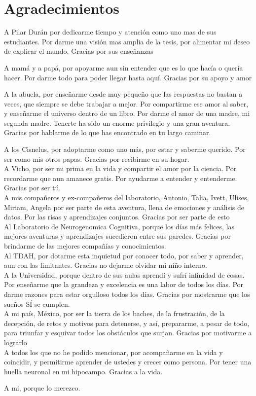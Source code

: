 \documentclass[12pt,letterpaper,final]{article}
\renewenvironment{acknowledgements}
{\newpage\section*{Agradecimientos}\begin{singlespace}\normalsize}
	{\end{singlespace}\par\newpage}
\begin{document}
\begin{acknowledgements}
A Pilar Durán por dedicarme tiempo y atención como uno mas de sus estudiantes. Por darme una visión mas amplia de la tesis, por alimentar mi deseo de explicar el mundo. Gracias por sus enseñanzas

A mamá y a papá, por apoyarme aun sin entender que es lo que hacía o quería hacer. Por darme todo para poder llegar hasta aquí. Gracias por su apoyo y amor

A la abuela, por enseñarme desde muy pequeño que las respuestas no bastan a veces, que siempre se debe trabajar a mejor. Por compartirme ese amor al saber, y enseñarme el universo dentro de un libro. Por darme el amor de una madre, mi segunda madre. Tenerte ha sido un enorme privilegio y una gran aventura.  Gracias por hablarme de lo que has encontrado en tu largo caminar.

A los Cisnelus, por adoptarme como uno más, por estar y saberme querido. Por ser como mis otros papas. Gracias por recibirme en su hogar.\\

A Vicho, por ser mi prima en la vida y compartir el amor por la ciencia. Por recordarme que aun amanece gratis.
Por ayudarme a entender y entenderme. Gracias por ser tú. \\

A mis compañeros y ex-compañeros del laboratorio, Antonio, Talia, Ivett, Ulises, Miriam, Angela por ser parte de esta aventura, llena de emociones y análisis de datos. Por las risas y aprendizajes conjuntos.  Gracias por ser parte de esto\\

Al Laboratorio de Neurogenomica Cognitiva, porque los días más felices, las mejores aventuras y aprendizajes sucedieron entre sus paredes. Gracias por brindarme de las mejores compañías y conocimientos. \\

Al TDAH, por dotarme esta inquietud por conocer todo, por saber y aprender, aun con las limitantes. Gracias no dejarme olvidar mi niño interno.\\

A la Universidad, porque dentro de sus aulas aprendí y sufrí infinidad de cosas. Por enseñarme que la grandeza y excelencia es una labor de todos los días. Por darme razones para estar orgulloso todos los días.
Gracias por mostrarme que los sueños SÍ se cumplen. \\

A mi país, México, por ser la tierra de los baches, de la frustración, de la decepción, de retos y motivos para detenerse, y así, prepararme, a pesar de todo, para triunfar y  esquivar todos los obstáculos que surjan. Gracias por motivarme a lograrlo \\

A todos los que no he podido mencionar, por acompañarme en la vida y coincidir, y permitirme aprender de ustedes y crecer como persona. Por tener una huella neuronal en mi hipocampo. Gracias a la vida.

A mi, porque lo merezco. 

\end{acknowledgements}
\end{document}
